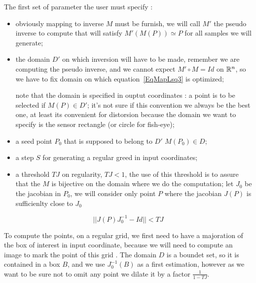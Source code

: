 The first set of parameter the user must specify :

\begin{itemize}
    \item obviously  mapping to inverse $M$ must be furnish, we will call $M'$ the pseudo
          inverse to compute that will satisfy $M'(M(P)) \simeq P$ for all samples we will generate;


    \item the domain $D'$ on which inversion will have to be made, remember we 
          are computing the pseudo inverse, and we cannot expect $M' \circ M = Id$
          on $\mathbb{R}^n$, so we have to fix domain on which equation~\ref{EqMapLsq3}
          is optimized;

          note that the domain is specified in ouptut coordinates : a point is
          to be selected if $M(P) \in D'$;  it's not sure if this convention we always
          be the best one, at least its convenient for distorsion because the domain
          we want to specify  is  the sensor rectangle (or circle for fish-eye);

    \item  a seed point $P_0$ that is supposed to belong to $D'$  $M(P_0) \in D$;

    \item  a step $S$ for generating a regular greed in input coordinates;

    \item  a threshold $TJ$ on regularity, $TJ<1$, the use of this threshold is to assure
           that the $M$ is bijective on the domain where we do the computation;
           let $J_0$  be the jacobian in $P_0$, we will consider only point $P$
           where the jacobian $J(P)$ is sufficienlty close to $J_0$

\end{itemize}

\begin{equation}
    ||  J(P) J_0^{-1} -Id|| < TJ  \label{EqJacCloseJ0}
\end{equation}


To compute the points,  on a regular grid, we first need to have a majoration
of the box of interest in input coordinate, because we will need to compute an
image to mark the point of this grid . The domain $D$ is a boundet set,
so it is contained in a box $B$, and we use $J_0^{-1}(B)$ as a first estimation,
however as we want to be sure not to omit any point we dilate it by a factor
$\frac{1}{1-TJ}$.





